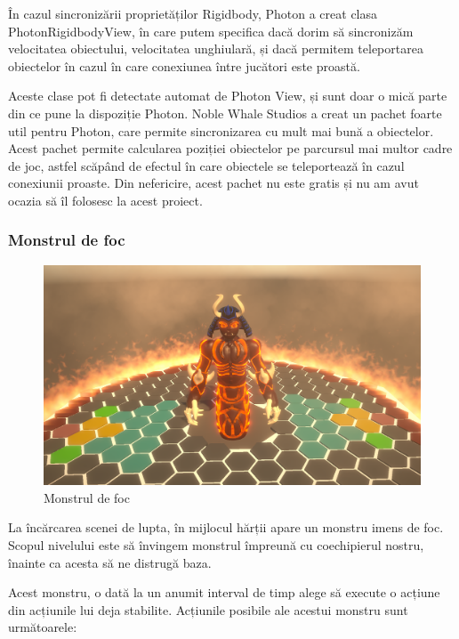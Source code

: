 \documentclass[12pt, a4paper]{article}
\begin{document}
	În cazul sincronizării proprietăților Rigidbody, Photon a creat clasa PhotonRigidbodyView, în care putem specifica dacă dorim să sincronizăm velocitatea obiectului, velocitatea unghiulară, și dacă permitem teleportarea obiectelor în cazul în care conexiunea între jucători este proastă.
	\newline
	
	Aceste clase pot fi detectate automat de Photon View, și sunt doar o mică parte din ce pune la dispoziție Photon. Noble Whale Studios a creat un pachet foarte util pentru Photon, care permite sincronizarea cu mult mai bună a obiectelor. Acest pachet permite calcularea poziției obiectelor pe parcursul mai multor cadre de joc, astfel scăpând de efectul în care obiectele se teleportează în cazul conexiunii proaste. Din nefericire, acest pachet nu este gratis și nu am avut ocazia să îl folosesc la acest proiect.
	
	
	
	
	
	\subsubsection{Monstrul de foc}
	\label{section: boss}
	
	\begin{figure}[H]
		\centering
		\includegraphics[width=1\textwidth]{fireDemon.png}
		\caption{Monstrul de foc}
		\label{fig: fireDemon}
	\end{figure}
	
	La încărcarea scenei de lupta, în mijlocul hărții apare un monstru imens de foc. Scopul nivelului este să învingem monstrul împreună cu coechipierul nostru, înainte ca acesta să ne distrugă baza.
	
	Acest monstru, o dată la un anumit interval de timp alege să execute o acțiune din acțiunile lui deja stabilite. Acțiunile posibile ale acestui monstru sunt următoarele:
	
\end{document}
